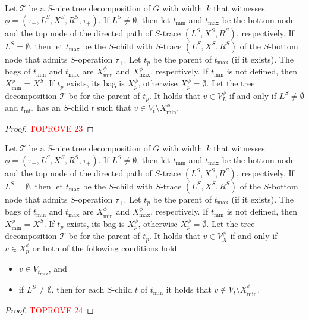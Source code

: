 \documentclass[a4paper,UKenglish,cleveref, autoref, thm-restate, numberwithinsect]{lipics-v2021}
\newcommand{\slim}{\text{slim}\xspace}
\newcommand{\topheavy}{\text{top-heavy}\xspace}
\begin{document}
\begin{lemma}\label{lem:vl}
Let $\mathcal{T}$ be a \slim $S$-nice tree decomposition of $G$ with width~$k$ that witnesses $\phi=(\tau_-,L^S, X^S, R^S,\tau_+)$. 
If $L^S\neq\emptyset$, then let $t_{\min}$ and $t_{\max}$ be the bottom node and the top node of the directed path of $S$-trace $(L^S, X^S, R^S)$, respectively. 
If $L^S=\emptyset$, then let $t_{\max}$ be the $S$-child with $S$-trace $(L^S, X^S, R^S)$ of the $S$-bottom node that admits $S$-operation $\tau_+$. 
Let $t_p$ be the parent of $t_{\max}$ (if it exists). 
The bags of $t_{\min}$ and $t_{\max}$ are $X^\phi_{\min}$ and $X^\phi_{\max}$, respectively. If $t_{\min}$ is not defined, then $X^\phi_{\min}=X^S$.
If $t_p$ exists, its bag is $X^\phi_p$, otherwise $X^\phi_p=\emptyset$.
Let the tree decomposition $\mathcal{T}$ be \topheavy for the parent of $t_p$. 
   It holds that $v\in V^\phi_L$ if and only if $L^S\neq \emptyset$ and $t_{\min}$ has an $S$-child $t$ such that $v\in V_t\setminus X^\phi_{\min}$.
\end{lemma}
\begin{proof}\textcolor{red}{TOPROVE 23}\end{proof}

\begin{lemma}\label{lem:vx}
Let $\mathcal{T}$ be a \slim $S$-nice tree decomposition of $G$ with width~$k$ that witnesses $\phi=(\tau_-,L^S, X^S, R^S,\tau_+)$. 
If $L^S\neq\emptyset$, then let $t_{\min}$ and $t_{\max}$ be the bottom node and the top node of the directed path of $S$-trace $(L^S, X^S, R^S)$, respectively. 
If $L^S=\emptyset$, then let $t_{\max}$ be the $S$-child with $S$-trace $(L^S, X^S, R^S)$ of the $S$-bottom node that admits $S$-operation $\tau_+$. 
Let $t_p$ be the parent of $t_{\max}$ (if it exists). 
The bags of $t_{\min}$ and $t_{\max}$ are $X^\phi_{\min}$ and $X^\phi_{\max}$, respectively. If $t_{\min}$ is not defined, then $X^\phi_{\min}=X^S$.
If $t_p$ exists, its bag is $X^\phi_p$, otherwise $X^\phi_p=\emptyset$.
Let the tree decomposition $\mathcal{T}$ be \topheavy for the parent of $t_p$. 
    It holds that $v\in V^\phi_X$ if and only if $v\in X^\phi_p$ or both of the following conditions hold.
    \begin{itemize}
        \item $v\in V_{t_{\max}}$, and
        \item if $L^S\neq\emptyset$, then for each $S$-child $t$ of $t_{\min}$ it holds that $v\notin V_t\setminus X^\phi_{\min}$.
    \end{itemize}
\end{lemma}
\begin{proof}\textcolor{red}{TOPROVE 24}\end{proof}
\end{document}
